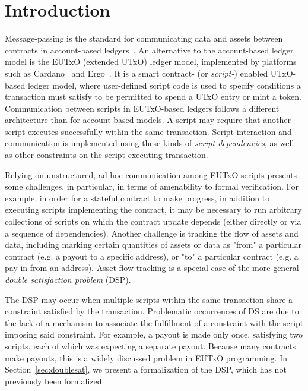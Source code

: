 \section{Introduction}
\label{sec:intro}

Message-passing is the standard for communicating data and assets between contracts in
account-based ledgers~\cite{ethereum,zilliqa,tezos}.
An alternative to the account-based ledger model is the EUTxO (extended UTxO) ledger
model, implemented by platforms such as Cardano~\cite{shelley,alonzo}
and Ergo~\cite{ergo}. It is a smart contract- (or \emph{script-}) enabled
UTxO-based ledger model, where user-defined script code is used to specify
conditions a transaction must satisfy to be permitted to spend a UTxO entry or mint a token.
Communication between scripts in EUTxO-based ledgers follows a different architecture
than for account-based models. A
script may require that another script executes successfully within the same transaction. Script interaction
and communication is implemented using these kinds of \emph{script dependencies},
as well as other constraints on the script-executing transaction.

Relying on unstructured, ad-hoc communication among EUTxO scripts presents some
challenges, in particular, in terms of amenability to formal verification.
For example, in order for a stateful contract to make progress,
in addition to executing scripts implementing the contract,
it may be necessary to run arbitrary collections of scripts on which the contract
update depends (either directly or via a sequence of dependencies). Another challenge is
tracking the flow of assets and data, including marking certain quantities of
assets or data as "from" a particular contract (e.g. a payout to a specific address),
or "to" a particular contract
(e.g. a pay-in from an address). Asset flow tracking is a special case of the more
general \emph{double satisfaction problem} (DSP).

The DSP may occur when multiple scripts within
the same transaction share a constraint satisfied by the transaction.
Problematic occurrences of DS are due to the lack of a mechanism to associate the
fulfillment of a constraint with the script imposing said constraint.
For example, a payout is made only once, satisfying two scripts, each of which
was expecting a separate payout.
Because many contracts make payouts, this is a widely discussed
problem in EUTxO programming.
In Section~\ref{sec:doublesat}, we present a formalization of the DSP, which has
not previously been formalized.

